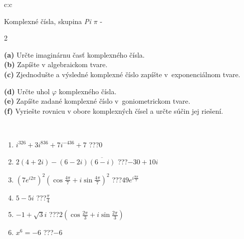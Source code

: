\documentclass[10pt]{report}
\begin{document}
\begin{tabular}{c:c}
\begin{minipage}[c][104.5mm][t]{0.5\linewidth}
\begin{center}
\vspace{7mm}
{\huge Komplexné čísla, skupina \textit{Pi $\pi$} -}\\[5mm]
\begin{minipage}{0.95\linewidth}
\begin{center}
{\small \begin{multicols}{2} \raggedright
\textbf{(a)} Určte imaginárnu časť komplexného čísla. \\[1mm]
\textbf{(b)} Zapíšte v algebraickom tvare. \\[1mm]
\textbf{(c)} Zjednodušte a výsledné komplexné číslo zapíšte v~exponenciálnom tvare. \par \columnbreak
\textbf{(d)} Určte uhol \(\varphi\) komplexného čísla. \\[1mm]
\textbf{(e)} Zapíšte zadané komplexné číslo v~goniometrickom tvare. \\[1mm]
\textbf{(f)} Vyriešte rovnicu v obore komplexných čísel a určte súčin jej riešení.
\end{multicols}
}
\end{center}
\end{minipage}
\\[4mm]
\begin{minipage}{0.79\linewidth}
\begin{center}
\begin{varwidth}{\linewidth}
\begin{enumerate}
\large
\item $i^{326}+3i^{836}+7i^{-436}+7$\quad \dotfill\; ???\;\dotfill \quad $0$
\item $2(4+2i)-(6-2i)\overline{(6-i)}$\quad \dotfill\; ???\;\dotfill \quad $-30+10i$
\item $\left(7e^{i2\pi}\right)^{2}\left(\cos{\frac{4\pi}{7}}+i\sin{\frac{4\pi}{7}}\right)^{2}$\quad \dotfill\; ???\;\dotfill \quad $49e^{i\frac{8\pi}{7}}$
\item $5-5i$\quad \dotfill\; ???\;\dotfill \quad $\frac{\pi}{4}$
\item $-1+\sqrt{3}i$\quad \dotfill\; ???\;\dotfill \quad $2\left(\cos{\frac{2\pi}{3}}+i\sin{\frac{2\pi}{3}}\right)$
\item $x^6=-6$\quad \dotfill\; ???\;\dotfill \quad $-6$
\end{enumerate}
\end{varwidth}
\end{center}

\end{minipage}
\end{center}
\end{minipage}
\end{tabular}
\end{document}
